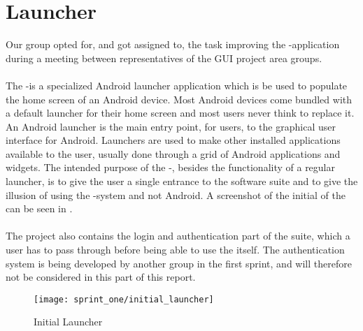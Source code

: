 
\section{Launcher}
Our group opted for, and got assigned to, the task improving the \giraf-\launcher application during a meeting between representatives of the GUI project area groups.
\\\\
The \giraf-\launcher is a specialized Android launcher application which is be used to populate the home screen of an Android device. Most Android devices come bundled with a default launcher for their home screen and most users never think to replace it. An Android launcher is the main entry point, for users, to the graphical user interface for Android. Launchers are used to make other installed applications available to the user, usually done through a grid of Android applications and widgets. The intended purpose of the \giraf-\launcher, besides the functionality of a regular launcher, is to give the user a single entrance to the \giraf software suite and to give the illusion of using the \giraf-system and not Android. A screenshot of the initial  of the \launcher can be seen in . 
\\\\
The \launcher project also contains the login and authentication part of the \giraf suite, which a user has to pass through before being able to use the \launcher itself. The authentication system is being developed by another group in the first sprint, and will therefore not be considered in this part of this report. 

\begin{figure}[!htbp]
	\centering
	\texttt{[image: sprint\_one/initial\_launcher]}
	\caption{Initial Launcher}
	\label{fig:initial_launcher}
\end{figure}
